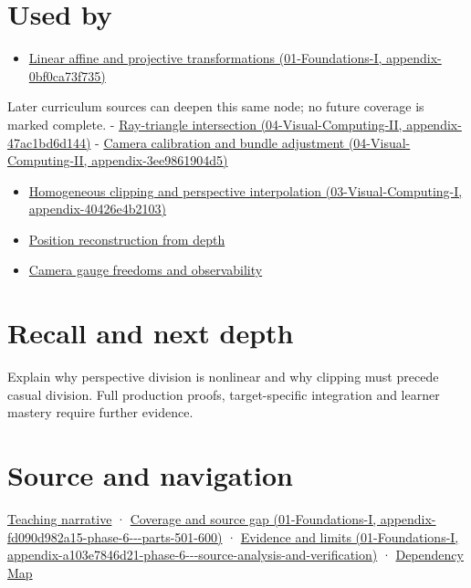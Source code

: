 \section{Used by}\label{appendix-cb3b26862282-used-by}

\begin{itemize}
\tightlist
\item
  \href{../01-Foundations-I/main.pdf\#nameddest=appendix-0bf0ca73f735}{Linear affine and projective transformations (01-Foundations-I, appendix-0bf0ca73f735)}
\end{itemize}

Later curriculum sources can deepen this same node; no future coverage is marked complete. - \href{../04-Visual-Computing-II/main.pdf\#nameddest=appendix-47ac1bd6d144}{Ray-triangle intersection (04-Visual-Computing-II, appendix-47ac1bd6d144)} - \href{../04-Visual-Computing-II/main.pdf\#nameddest=appendix-3ee9861904d5}{Camera calibration and bundle adjustment (04-Visual-Computing-II, appendix-3ee9861904d5)}

\begin{itemize}
\tightlist
\item
  \href{../03-Visual-Computing-I/main.pdf\#nameddest=appendix-40426e4b2103}{Homogeneous clipping and perspective interpolation (03-Visual-Computing-I, appendix-40426e4b2103)}
\item
  \hyperref[appendix-2cbf2968e866]{Position reconstruction from depth}
\item
  \hyperref[appendix-113f0267e5f4]{Camera gauge freedoms and observability}
\end{itemize}

\section{Recall and next depth}\label{appendix-cb3b26862282-recall-and-next-depth}

Explain why perspective division is nonlinear and why clipping must precede casual division. Full production proofs, target-specific integration and learner mastery require further evidence.

\section{Source and navigation}\label{appendix-cb3b26862282-source-and-navigation}

\href{Continuous\%20Notes/Computing\%20Foundations\%20-\%20From\%20Bits\%20to\%20C++\%20and\%20Systems\%20APIs\#Homogeneous\%20coordinates\%20preserve\%20the\%20role\%20of\%20a\%20location}{Teaching narrative} · \href{../01-Foundations-I/main.pdf\#nameddest=appendix-fd090d982a15-phase-6---parts-501-600}{Coverage and source gap (01-Foundations-I, appendix-fd090d982a15-phase-6-\/-\/-parts-501-600)} · \href{../01-Foundations-I/main.pdf\#nameddest=appendix-a103e7846d21-phase-6---source-analysis-and-verification}{Evidence and limits (01-Foundations-I, appendix-a103e7846d21-phase-6-\/-\/-source-analysis-and-verification)} · \hyperref[appendix-4ad47bdd269a]{Dependency Map}

